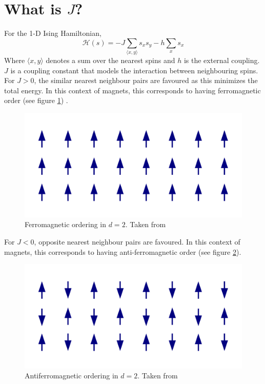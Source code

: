 \documentclass{cernatsnote}
\begin{document}
\section{What is $J$?}
For the 1-D Ising Hamiltonian,
\begin{equation}
    \mathcal{H}(s)=-J \sum_{\langle x, y\rangle} s_x s_y-h \sum_x s_x
\end{equation}
Where $\langle x, y\rangle$ denotes a sum over the nearest spins and $h$ is the external coupling. $J$ is a coupling constant that models the interaction between neighbouring spins. For $J>0$, the similar nearest neighbour pairs are favoured as this minimizes the total energy. In this context of magnets, this corresponds to having ferromagnetic order (see figure \ref{fig:ferro}) \cite{thijssen}.
\begin{figure}[H]
    \centering
    \includegraphics[scale=0.1]{images/Ferromagnetic_ordering.svg.png}
    \caption{Ferromagnetic ordering in $d=2$. Taken from \cite{ferro}}
    \label{fig:ferro}
\end{figure}
For $J<0$, opposite nearest neighbour pairs are favoured. In this context of magnets, this corresponds to having anti-ferromagnetic order (see figure \ref{fig:anti_ferro}).
\begin{figure}[H]
    \centering
    \includegraphics[scale=0.1]{images/Antiferromagnetic_ordering.svg.png}
    \caption{Antiferromagnetic ordering in $d=2$. Taken from \cite{anti}}
    \label{fig:anti_ferro}
\end{figure}
\end{document}
